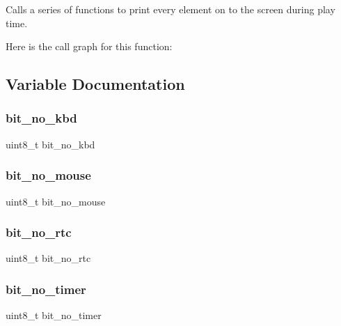Calls a series of functions to print every element on to the screen during play time. 

Here is the call graph for this function\+:


\subsection{Variable Documentation}
\mbox{\label{group__game_ga6d6813b4ed3fe31a49b13b3cd616beb5}} 
\subsubsection{\texorpdfstring{bit\_no\_kbd}{bit\_no\_kbd}}
{\footnotesize\ttfamily uint8\+\_\+t bit\+\_\+no\+\_\+kbd}

\mbox{\label{group__game_ga3553354293e11c5cd620f549a9b0125d}} 
\subsubsection{\texorpdfstring{bit\_no\_mouse}{bit\_no\_mouse}}
{\footnotesize\ttfamily uint8\+\_\+t bit\+\_\+no\+\_\+mouse}

\mbox{\label{group__game_ga260e7fab8fc77111f366569f300d9947}} 
\subsubsection{\texorpdfstring{bit\_no\_rtc}{bit\_no\_rtc}}
{\footnotesize\ttfamily uint8\+\_\+t bit\+\_\+no\+\_\+rtc}

\mbox{\label{group__game_ga4594ebb7bd04d177d6cd263c79326508}} 
\subsubsection{\texorpdfstring{bit\_no\_timer}{bit\_no\_timer}}
{\footnotesize\ttfamily uint8\+\_\+t bit\+\_\+no\+\_\+timer}

